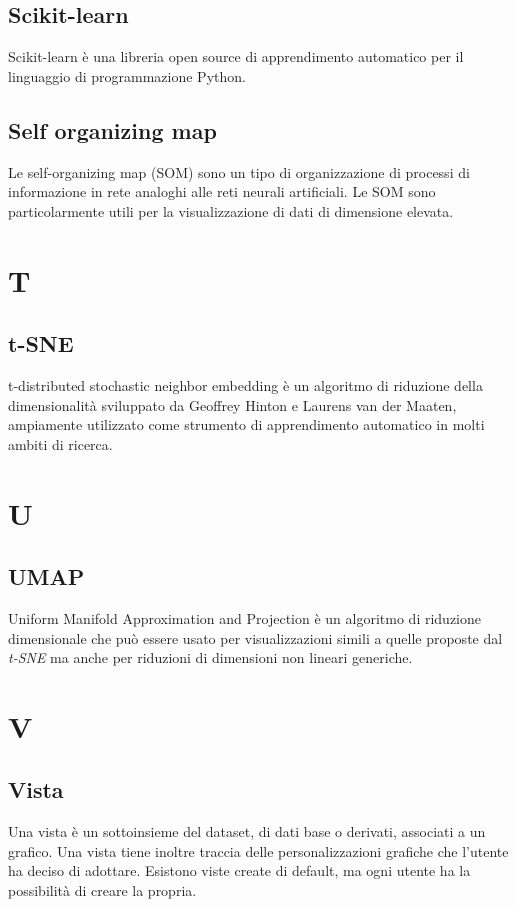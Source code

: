\subsection{Scikit-learn}
Scikit-learn è una libreria open source di apprendimento automatico per il linguaggio di programmazione Python.

\subsection{Self organizing map}
Le self-organizing map (SOM) sono un tipo di organizzazione di processi di informazione in rete analoghi alle reti neurali artificiali. Le SOM sono particolarmente utili per la visualizzazione di dati di dimensione elevata.

\section{T}
\subsection{t-SNE}
t-distributed stochastic neighbor embedding è un algoritmo di riduzione della dimensionalità sviluppato da Geoffrey Hinton e Laurens van der Maaten, ampiamente utilizzato come strumento di apprendimento automatico in molti ambiti di ricerca.

\section{U}
\subsection{UMAP}
Uniform Manifold Approximation and Projection è un algoritmo di riduzione dimensionale che può essere usato per visualizzazioni simili a quelle proposte dal \textit{t-SNE} ma anche per  riduzioni di dimensioni non lineari generiche.

\section{V}
\subsection{Vista}
Una vista è un sottoinsieme del dataset, di dati base o derivati, associati a un grafico. Una vista tiene inoltre traccia delle personalizzazioni grafiche che l'utente ha deciso di adottare. Esistono viste create di default, ma ogni utente ha la possibilità di creare la propria.

